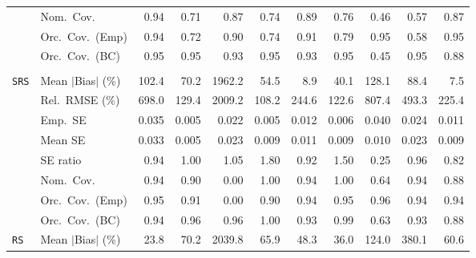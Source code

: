 \begin{landscape}
\begin{longtable}{llrrrrrrrrr}
 & Nom.\ Cov. & \cellcolor{rankone}0.94 & 0.71 & \cellcolor{rankthree}0.87 & 0.74 & \cellcolor{ranktwo}0.89 & 0.76 & 0.46 & 0.57 & \cellcolor{rankthree}0.87 \\
 & Orc.\ Cov.\ (Emp) & \cellcolor{ranktwo}0.94 & 0.72 & 0.90 & 0.74 & \cellcolor{rankthree}0.91 & 0.79 & \cellcolor{rankone}0.95 & 0.58 & \cellcolor{rankone}0.95 \\
 & Orc.\ Cov.\ (BC) & \cellcolor{rankone}0.95 & \cellcolor{rankone}0.95 & \cellcolor{ranktwo}0.93 & \cellcolor{rankone}0.95 & \cellcolor{ranktwo}0.93 & \cellcolor{rankone}0.95 & 0.45 & \cellcolor{rankone}0.95 & \cellcolor{rankthree}0.88 \\
\addlinespace[2pt]
\multicolumn{11}{l}{\textbf{Interaction}} \\
\addlinespace[2pt]
\quad \texttt{SRS} & Mean $|$Bias$|$ (\%) & 102.4 & 70.2 & 1962.2 & 54.5 & \cellcolor{ranktwo}8.9 & \cellcolor{rankthree}40.1 & 128.1 & 88.4 & \cellcolor{rankone}7.5 \\
 & Rel.\ RMSE (\%) & 698.0 & \cellcolor{rankthree}129.4 & 2009.2 & \cellcolor{rankone}108.2 & 244.6 & \cellcolor{ranktwo}122.6 & 807.4 & 493.3 & 225.4 \\
 & Emp.\ SE & 0.035 & 0.005 & 0.022 & 0.005 & 0.012 & 0.006 & 0.040 & 0.024 & 0.011 \\
 & Mean SE & 0.033 & 0.005 & 0.023 & 0.009 & 0.011 & 0.009 & 0.010 & 0.023 & 0.009 \\
 & SE ratio & 0.94 & \cellcolor{rankone}1.00 & \cellcolor{rankthree}1.05 & 1.80 & 0.92 & 1.50 & 0.25 & \cellcolor{ranktwo}0.96 & 0.82 \\
 & Nom.\ Cov. & \cellcolor{rankone}0.94 & \cellcolor{ranktwo}0.90 & 0.00 & \cellcolor{ranktwo}1.00 & \cellcolor{rankone}0.94 & \cellcolor{ranktwo}1.00 & 0.64 & \cellcolor{rankone}0.94 & \cellcolor{rankthree}0.88 \\
 & Orc.\ Cov.\ (Emp) & \cellcolor{rankone}0.95 & \cellcolor{rankthree}0.91 & 0.00 & 0.90 & \cellcolor{ranktwo}0.94 & \cellcolor{rankone}0.95 & \cellcolor{ranktwo}0.96 & \cellcolor{ranktwo}0.94 & \cellcolor{ranktwo}0.94 \\
 & Orc.\ Cov.\ (BC) & \cellcolor{rankone}0.94 & \cellcolor{rankone}0.96 & \cellcolor{rankone}0.96 & 1.00 & \cellcolor{ranktwo}0.93 & \cellcolor{rankthree}0.99 & 0.63 & \cellcolor{ranktwo}0.93 & 0.88 \\
\addlinespace[2pt]
\quad \texttt{RS} & Mean $|$Bias$|$ (\%) & \cellcolor{rankone}23.8 & 70.2 & 2039.8 & 65.9 & \cellcolor{rankthree}48.3 & \cellcolor{ranktwo}36.0 & 124.0 & 380.1 & 60.6 \\

\end{longtable}
\end{landscape}
